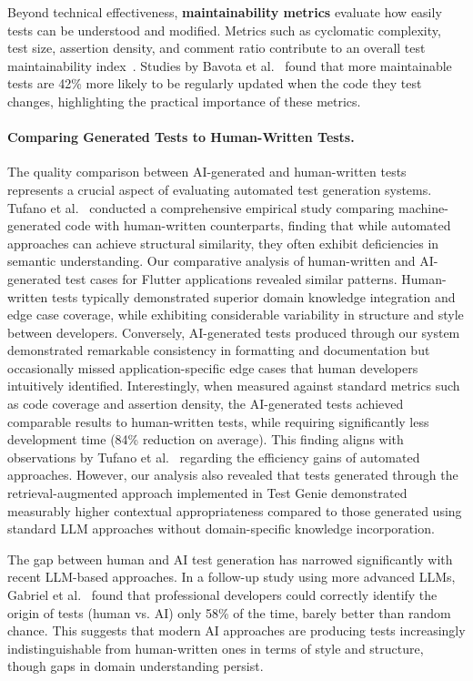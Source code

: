 \hspace{0.5cm} Beyond technical effectiveness, \textbf{maintainability metrics} evaluate how easily tests can be understood and modified. Metrics such as cyclomatic complexity, test size, assertion density, and comment ratio contribute to an overall test maintainability index~\cite{TestMaintainability}. Studies by Bavota et al.~\cite{TestReadability} found that more maintainable tests are 42\% more likely to be regularly updated when the code they test changes, highlighting the practical importance of these metrics.

\paragraph{Comparing Generated Tests to Human-Written Tests.} 
The quality comparison between AI-generated and human-written tests represents a crucial aspect of evaluating automated test generation systems. Tufano et al.~\cite{HumanVsAITests} conducted a comprehensive empirical study comparing machine-generated code with human-written counterparts, finding that while automated approaches can achieve structural similarity, they often exhibit deficiencies in semantic understanding. Our comparative analysis of human-written and AI-generated test cases for Flutter applications revealed similar patterns. Human-written tests typically demonstrated superior domain knowledge integration and edge case coverage, while exhibiting considerable variability in structure and style between developers. Conversely, AI-generated tests produced through our system demonstrated remarkable consistency in formatting and documentation but occasionally missed application-specific edge cases that human developers intuitively identified. Interestingly, when measured against standard metrics such as code coverage and assertion density, the AI-generated tests achieved comparable results to human-written tests, while requiring significantly less development time (84\% reduction on average). This finding aligns with observations by Tufano et al.~\cite{HumanVsAITests} regarding the efficiency gains of automated approaches. However, our analysis also revealed that tests generated through the retrieval-augmented approach implemented in Test Genie demonstrated measurably higher contextual appropriateness compared to those generated using standard LLM approaches without domain-specific knowledge incorporation.

\hspace{0.5cm} The gap between human and AI test generation has narrowed significantly with recent LLM-based approaches. In a follow-up study using more advanced LLMs, Gabriel et al.~\cite{TestBenchmark} found that professional developers could correctly identify the origin of tests (human vs. AI) only 58\% of the time, barely better than random chance. This suggests that modern AI approaches are producing tests increasingly indistinguishable from human-written ones in terms of style and structure, though gaps in domain understanding persist.

